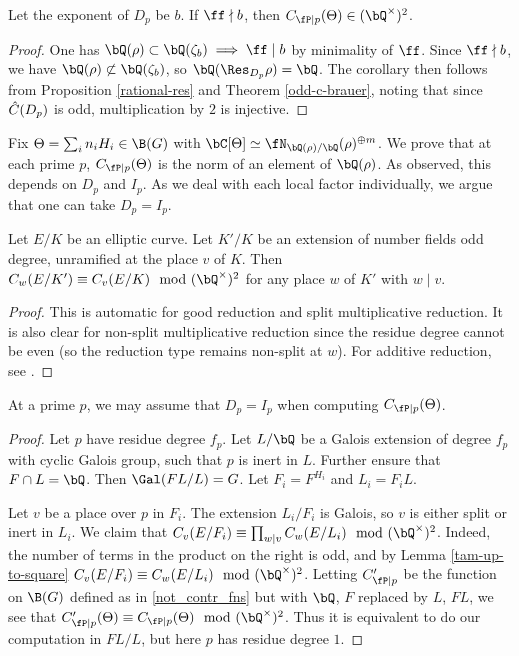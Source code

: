 \begin{cor}\label{rational-res-2}
    Let the exponent of $D_p$ be $b$. If $\ff \nmid b$, then $C_{\fP \mid p}(\Theta) \in (\bQ^{\times})^2$.
\end{cor}

\begin{proof}
    One has $\bQ(\rho) \subset \bQ(\zeta_b) \implies \ff \mid b$ by minimality of $\ff$. Since $\ff \nmid b$, we have $\bQ(\rho) \not\subset \bQ(\zeta_b)$, so $\bQ(\Res_{D_p} \rho) = \bQ$. The corollary then follows from Proposition \ref{rational-res} and Theorem \ref{odd-c-brauer}, noting that since $\hat{C}(D_p)$ is odd, multiplication by $2$ is injective. 
\end{proof}

Fix $\Theta = \sum_i n_i H_i \in \B(G)$ with $\bC[\Theta] \simeq \repnorm{\rho}^{\oplus m}$. We prove that at each prime $p$, $C_{\fP \mid p}(\Theta)$ is the norm of an element of $\bQ(\rho)$.  As observed, this depends on $D_p$ and $I_p$. As we deal with each local factor individually, we argue that one can take $D_p = I_p$.

\begin{lemma}\label{tam-up-to-square}
    Let $E / K$ be an elliptic curve. Let $K' / K$ be an extension of number fields odd degree, unramified at the place $v$ of $K$. Then $C_w(E / K') \equiv C_v(E / K) \mod (\bQ^{\times})^2$ for any place $w$ of $K'$ with $ w \mid v$. 
\end{lemma}

\begin{proof}
This is automatic for good reduction and split multiplicative reduction. It is also clear for non-split multiplicative reduction since the residue degree cannot be even (so the reduction type remains non-split at $w$). For additive reduction, see \cite[Lemma 3.12]{reg-const}.
\end{proof}

\begin{lemma}\label{DeqI}
    At a prime $p$, we may assume that $D_p = I_p$ when computing $C_{\fP \mid p}(\Theta)$. 
\end{lemma}

\begin{proof}
Let $p$ have residue degree $f_p$. Let $L / \bQ$ be a Galois extension of degree $f_p$ with cyclic Galois group, such that $p$ is inert in $L$. Further ensure that $F \cap L = \bQ$. Then $\Gal(FL / L) = G$. Let $F_i = F^{H_i}$ and $L_i = F_i L$.

Let $v$ be a place over $p$ in $F_i$. The extension $L_i / F_i$ is Galois, so $v$ is either split or inert in $L_i$.
We claim that $C_v(E / F_i) \equiv \prod_{w | v} C_w(E / L_i) \mod (\bQ^{\times})^2$. Indeed, the number of terms in the product on the right is odd, and by Lemma \ref{tam-up-to-square} $C_v(E / F_i) \equiv C_w(E / L_i) \mod (\bQ^{\times})^2$. 
Letting $C_{\fP \mid p}'$ be the function on $\B(G)$ defined as in \eqref{not_contr_fns} but with $\bQ$, $F$ replaced by $L$, $FL$, we see that $C_{\fP \mid p}'(\Theta) \equiv C_{\fP \mid p}(\Theta) \mod (\bQ^{\times})^2$. 
Thus it is equivalent to do our computation in $FL / L$, but here $p$ has residue degree $1$.
\end{proof}


